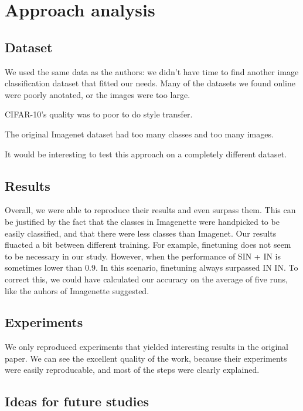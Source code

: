 \documentclass{article}
\begin{document}
\section{Approach analysis}

\subsection{Dataset}

We used the same data as the authors: we didn't have time
to find another image classification dataset that fitted our needs.
Many of the datasets we found online were poorly anotated, or the images
were too large.

CIFAR-10's quality was to poor to do style transfer.

The original Imagenet dataset had too many classes and too many images.

It would be interesting to test this approach on a completely different dataset.

\subsection{Results}

Overall, we were able to reproduce their results and
even surpass them. This can be justified by the fact that the classes
in Imagenette were handpicked to be easily classified, and that there were less 
classes than Imagenet.
Our results fluacted a bit between different training. For example, finetuning does not seem to be necessary 
in our study. However, when the performance of SIN + IN is sometimes lower than 0.9. In this scenario, finetuning
always surpassed IN \texorpdfstring{\textrightarrow} .IN.
To correct this, we could have calculated our accuracy on the average of five runs, like the auhors of Imagenette \cite{fastai2019}
suggested.

\subsection{Experiments}

We only reproduced experiments that yielded interesting results 
in the original paper. We can see the excellent quality of the work, 
because their experiments were easily reproducable, and most of the 
steps were clearly explained.

\subsection{Ideas for future studies}
\end{document}

